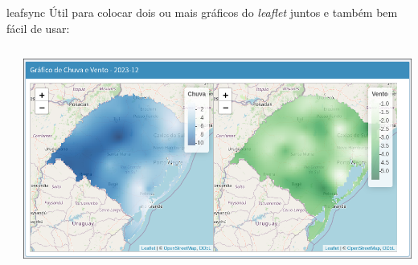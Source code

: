 \documentclass[aspectratio=1610]{beamer}
\begin{document}
\begin{frame}{leafsync}
    Útil para colocar dois ou mais gráficos do \textit{leaflet} juntos e também bem fácil de usar:
    \begin{columns}
        \begin{column}{0.5\textwidth}
            \begin{tcolorbox}[title=Código leafsync,colback=wcprimary10,colbacktitle=wcprimary,colframe=white,fontlower=\small]
            \end{tcolorbox}
        \end{column}
        \begin{column}{0.5\textwidth}
            \includegraphics[width=\textwidth]{krigagem.png}
        \end{column}
    \end{columns}
\end{frame}
\end{document}
